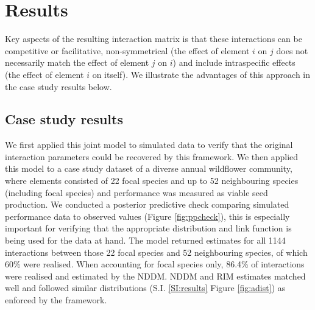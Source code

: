 \documentclass[a4,12pt]{article}
\begin{document}
\section{Results}


    Key aspects of the resulting interaction matrix is that these interactions can be competitive or facilitative, non-symmetrical (the effect of element $i$ on $j$ does not necessarily match the effect of element $j$ on $i$) and include intraspecific effects (the effect of element $i$ on itself). We illustrate the advantages of this approach in the case study results below. 


    \subsection{Case study results}

    We first applied this joint model to simulated data to verify that the original interaction parameters could be recovered by this framework. We then applied this model to a case study dataset of a diverse annual wildflower community, where elements consisted of 22 focal species and up to 52 neighbouring species (including focal species) and performance was measured as viable seed production. We conducted a posterior predictive check comparing simulated performance data to observed values (Figure \ref{fig:ppcheck}), this is especially important for verifying that the appropriate distribution and link function is being used for the data at hand. The model returned estimates for all 1144 interactions between those 22 focal species and 52 neighbouring species, of which 60\% were realised.  When accounting for focal species only, 86.4\% of interactions were realised and estimated by the NDDM. NDDM and RIM estimates matched well and followed similar distributions (S.I. \ref{SI:results} Figure \ref{fig:adist}) as enforced by the framework. 
    



\end{document}
